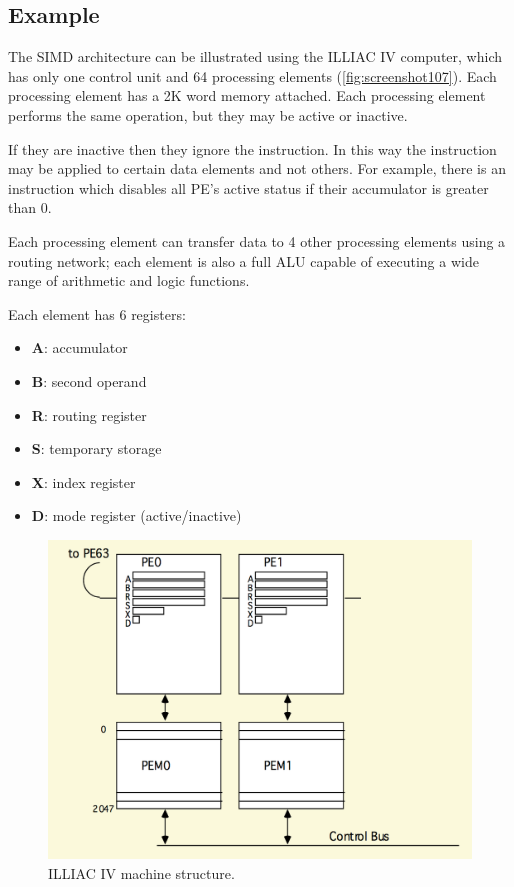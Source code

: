 \subsection{Example}
The SIMD architecture can be illustrated using the ILLIAC IV computer, which has only one control unit and 64 processing elements (\autoref{fig:screenshot107}). Each processing element has a 2K word memory attached. Each processing element performs the same operation, but they may be active or inactive. 

If they are inactive then they ignore the instruction. In this way the instruction may be applied to certain data elements and not others. For example, there is an instruction which disables all PE's active status if their accumulator is greater than 0.

Each processing element can transfer data to 4 other processing elements using a routing network; each element is also a full ALU capable of executing a wide range of arithmetic and logic functions. 

Each element has 6 registers: \begin{itemize}
\item \textbf{A}: accumulator 
\item \textbf{B}: second operand  
\item \textbf{R}: routing register 
\item \textbf{S}: temporary storage 
\item \textbf{X}: index register 
\item \textbf{D}: mode register (active/inactive) 
\end{itemize}

\begin{figure}
\centering
\includegraphics[width=0.7\linewidth]{figures/screenshot107}
\caption{ILLIAC IV machine structure.}
\label{fig:screenshot107}
\end{figure}

